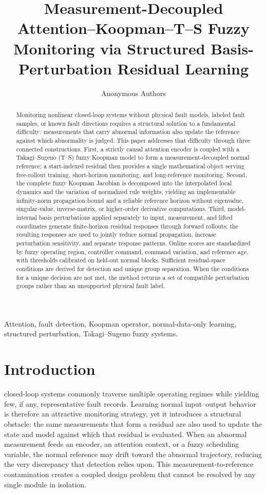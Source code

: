 \documentclass[journal]{IEEEtran}
\title{Measurement-Decoupled Attention--Koopman--T--S Fuzzy Monitoring via Structured Basis-Perturbation Residual Learning}
\author{Anonymous Authors}
\newcommand{\1}{\bm 1}
\begin{document}
\maketitle

\begin{abstract}
Monitoring nonlinear closed-loop systems without physical fault models,
labeled fault samples, or known fault directions requires a structural
solution to a fundamental difficulty: measurements that carry abnormal
information also update the reference against which abnormality is judged.
This paper addresses that difficulty through three connected constructions.
First, a strictly causal attention encoder is coupled with a Takagi--Sugeno
(T--S) fuzzy Koopman model to form a measurement-decoupled normal reference;
a start-indexed residual then provides a single mathematical object serving
free-rollout training, short-horizon monitoring, and long-reference
monitoring. Second, the complete fuzzy Koopman Jacobian is decomposed into
the interpolated local dynamics and the variation of normalized rule
weights, yielding an implementable infinity-norm propagation bound and a
reliable reference horizon without eigenvalue, singular-value,
inverse-matrix, or higher-order derivative computations. Third,
model-internal basis perturbations applied separately to input, measurement,
and lifted coordinates generate finite-horizon residual responses through
forward rollouts; the resulting responses are used to jointly reduce normal
propagation, increase perturbation sensitivity, and separate response
patterns. Online scores are standardized by fuzzy operating region,
controller command, command variation, and reference age, with thresholds
calibrated on held-out normal blocks. Sufficient residual-space conditions
are derived for detection and unique group separation. When the conditions
for a unique decision are not met, the method returns a set of compatible
perturbation groups rather than an unsupported physical fault label.
\end{abstract}

\begin{IEEEkeywords}
Attention, fault detection, Koopman operator, normal-data-only learning,
structured perturbation, Takagi--Sugeno fuzzy systems.
\end{IEEEkeywords}

\section{Introduction}
 closed-loop systems commonly traverse multiple
operating regimes while yielding few, if any, representative fault records.
Learning normal input--output behavior is therefore an attractive monitoring
strategy, yet it introduces a structural obstacle: the same measurements that
form a residual are also used to update the state and model against which that
residual is evaluated. When an abnormal measurement feeds an encoder, an
attention context, or a fuzzy scheduling variable, the normal reference may
drift toward the abnormal trajectory, reducing the very discrepancy that
detection relies upon. This measurement-to-reference contamination creates a
coupled design problem that cannot be resolved by any single module in
isolation.
\end{document}
